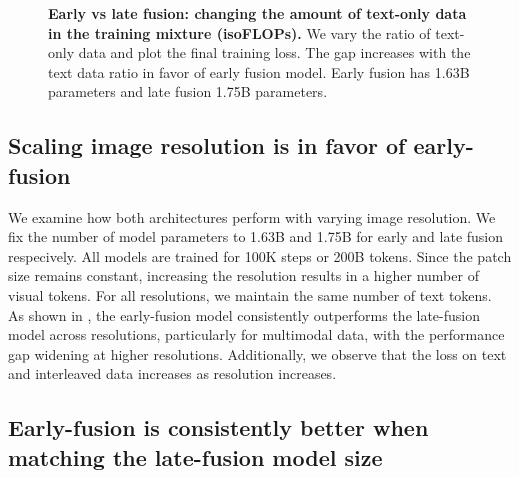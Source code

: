 \begin{figure}[htp]
    \centering
    \captionsetup{type=figure}
    \begin{subfigure}[t]{0.33\linewidth}
        
    \end{subfigure}
    \begin{subfigure}[t]{0.32\linewidth}
        
    \end{subfigure}
    \begin{subfigure}[t]{0.32\linewidth}
        
    \end{subfigure}
            
    \vspace{0.3cm}
    \caption{\textbf{Early vs late fusion: changing the amount of text-only data in the training mixture (isoFLOPs).} We vary the ratio of text-only data and plot the final training loss. The gap increases with the text data ratio in favor of early fusion model. Early fusion has 1.63B parameters and late fusion 1.75B parameters.}
    \label{fig:early_vs_late_textratio}
\end{figure}



\subsection{Scaling image resolution is in favor of early-fusion}

We examine how both
architectures perform with varying image resolution. We fix the number of model parameters to 1.63B and 1.75B for early and late fusion respecively. All models are trained for 100K steps or 200B tokens. Since the patch size remains
constant, increasing the resolution results in a higher number of visual tokens. For all resolutions, we maintain the same number of text tokens.
As shown in , the early-fusion model
consistently outperforms the late-fusion model across resolutions, particularly
for multimodal data, with the performance gap widening at higher resolutions.
Additionally, we observe that the loss on text and interleaved data increases as
resolution increases.

\vspace{1cm}
\subsection{Early-fusion is consistently better when matching the late-fusion model size}



